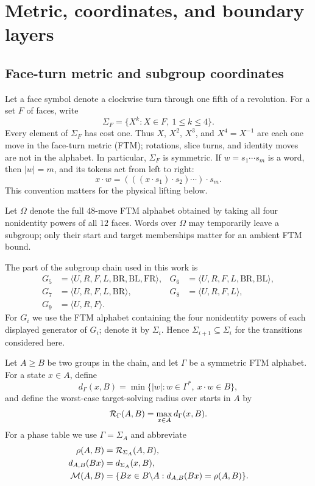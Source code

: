 \section{Metric, coordinates, and boundary layers}
\label{sec:mathematics}

\subsection{Face-turn metric and subgroup coordinates}
\label{sec:metric-coordinates}

Let a face symbol denote a clockwise turn through one fifth of a revolution.
For a set $F$ of faces, write
\[
  \Sigma_F=\{X^k:X\in F,\ 1\leq k\leq4\}.
\]
Every element of $\Sigma_F$ has cost one.  Thus $X$, $X^2$, $X^3$, and
$X^4=X^{-1}$ are each one move in the face-turn metric (FTM); rotations,
slice turns, and identity moves are not in the alphabet.  In particular,
$\Sigma_F$ is symmetric.  If $w=s_1\cdots s_m$ is a word, then
$|w|=m$, and its tokens act from left to right:
\[
  x\mathbin{\cdot}w
  =(((x\mathbin{\cdot}s_1)\mathbin{\cdot}s_2)\cdots)
    \mathbin{\cdot}s_m.
\]
This convention matters for the physical lifting below.

Let $\Omega$ denote the full $48$-move FTM alphabet obtained by taking all
four nonidentity powers of all $12$ faces.  Words over $\Omega$ may temporarily
leave a subgroup; only their start and target memberships matter for an
ambient FTM bound.

The part of the subgroup chain used in this work is
\begin{align*}
  G_5&=\langle U,R,F,L,\mathrm{BR},\mathrm{BL},\mathrm{FR}\rangle,
  &G_6&=\langle U,R,F,L,\mathrm{BR},\mathrm{BL}\rangle,\\
  G_7&=\langle U,R,F,L,\mathrm{BR}\rangle,
  &G_8&=\langle U,R,F,L\rangle,\\
  G_9&=\langle U,R,F\rangle.
\end{align*}
For $G_i$ we use the FTM alphabet containing the four nonidentity powers of
each displayed generator of $G_i$; denote it by $\Sigma_i$.  Hence
$\Sigma_{i+1}\subseteq\Sigma_i$ for the transitions considered here.

\begin{definition}
\label{def:target-distance}
Let $A\geq B$ be two groups in the chain, and let $\Gamma$ be a symmetric FTM
alphabet.  For a state $x\in A$, define
\[
  d_{\Gamma}(x,B)
    =\min\bigl\{|w|:w\in\Gamma^*,\ x\mathbin{\cdot}w\in B\bigr\},
\]
and define the worst-case target-solving radius over starts in $A$ by
\[
  \mathcal{R}_{\Gamma}(A,B)=\max_{x\in A}d_{\Gamma}(x,B).
\]
For a phase table we use $\Gamma=\Sigma_A$ and abbreviate
\begin{align*}
  \rho(A,B)&=\mathcal{R}_{\Sigma_A}(A,B),\\
  d_{A,B}(Bx)&=d_{\Sigma_A}(x,B),\\
  \mathcal M(A,B)
    &=\{Bx\in B\backslash A:d_{A,B}(Bx)=\rho(A,B)\}.
\end{align*}
\end{definition}

